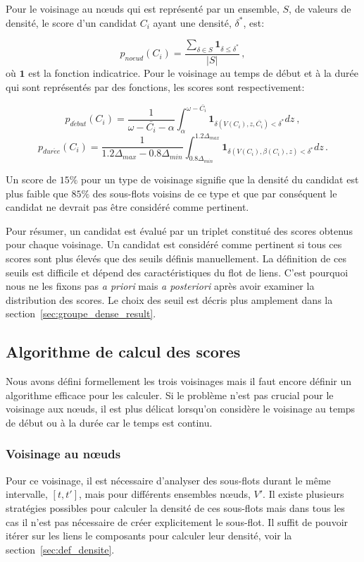 Pour le voisinage au n\oe uds qui est représenté par un ensemble, $S$, de valeurs de densité, le score d'un candidat $C_i$ ayant une densité, $\delta^*$, est:

\begin{equation}
p_{noeud}(C_i)= \dfrac{\sum_{\delta \in S} \mathbf{1}_{\delta \le \delta^*}}{|S|}\,,
\end{equation}
où $\mathbf{1}$ est la fonction indicatrice.
Pour le voisinage au temps de début et à la durée qui sont représentés par des fonctions, les scores sont respectivement:

\begin{equation}
p_{d\acute{e}but}(C_i)=\dfrac{1}{\omega-\bar{C_i} - \alpha} \int_{\alpha}^{\omega- \bar{C_i}} \mathbf{1}_{\delta(V(C_i),z,\bar{C_i}) <\delta^*} dz \ ,
\end{equation} 
\begin{equation}
p_{dur\acute{e}e}(C_i)=\dfrac{1}{1.2\Delta_{max} - 0.8\Delta_{min}} \int_{0.8\Delta_{min}}^{1.2\Delta_{max}} \mathbf{1}_{\delta(V(C_i),\beta(C_i),z) <\delta^*} dz \, .
\end{equation}

Un score de $15\%$ pour un type de voisinage signifie que la densité du candidat est plus faible que $85\%$ des sous-flots voisins de ce type et que par conséquent le candidat ne devrait pas être considéré comme pertinent.

\bigskip
Pour résumer, un candidat est évalué par un triplet constitué des scores obtenus pour chaque voisinage.
Un candidat est considéré comme pertinent si tous ces scores sont plus élevés que des seuils définis manuellement.
La définition de ces seuils est difficile et dépend des caractéristiques du flot de liens.
C'est pourquoi nous ne les fixons pas \emph{a priori} mais \emph{a posteriori} après avoir examiner la distribution des scores.
Le choix des seuil est décris plus amplement dans la section~\ref{sec:groupe_dense_result}.

\subsection{Algorithme de calcul des scores}
Nous avons défini formellement les trois voisinages mais il faut encore définir un algorithme efficace pour les calculer.
Si le problème n'est pas crucial pour le voisinage aux n\oe uds, il est plus délicat lorsqu'on considère le voisinage au temps de début ou à la durée car le temps est continu.

\subsubsection{Voisinage au n\oe uds}
Pour ce voisinage, il est nécessaire d'analyser des sous-flots durant le même intervalle, $[t,t']$, mais pour différents ensembles n\oe uds, $V'$.
Il existe plusieurs stratégies possibles pour calculer la densité  de ces sous-flots mais dans tous les cas il n'est pas nécessaire de créer explicitement le sous-flot.
Il suffit de pouvoir itérer sur les liens le composants pour calculer leur densité, voir la section~\ref{sec:def_densite}.

